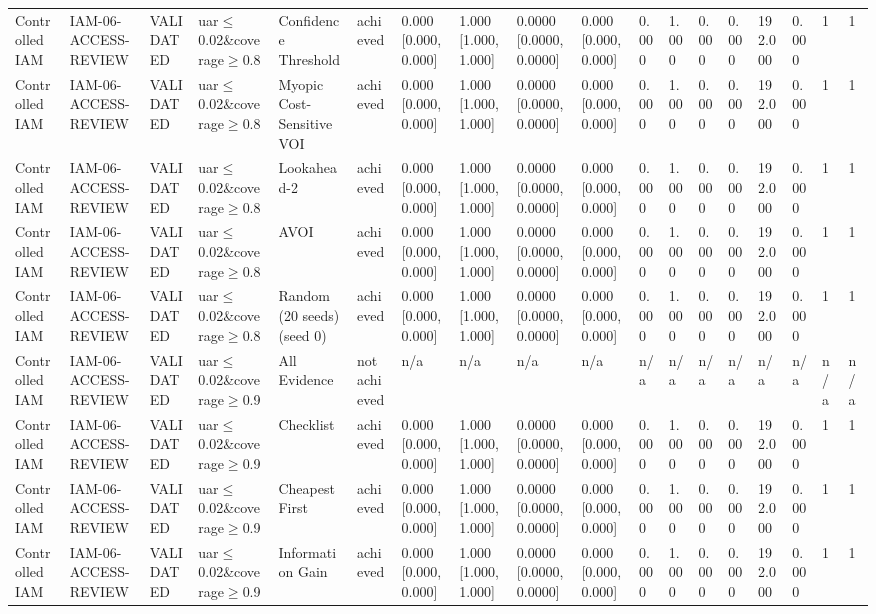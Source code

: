 \begin{table}[!ht]
{\begin{tabular}{llllllllllllllllll}
Controlled IAM & IAM-06-ACCESS-REVIEW & VALIDATED & uar$\le$0.02\&coverage$\ge$0.8 & Confidence Threshold & achieved & 0.000 [0.000, 0.000] & 1.000 [1.000, 1.000] & 0.0000 [0.0000, 0.0000] & 0.000 [0.000, 0.000] & 0.000 & 1.000 & 0.000 & 0.000 & 192.000 & 0.000 & 1 & 1 \\
Controlled IAM & IAM-06-ACCESS-REVIEW & VALIDATED & uar$\le$0.02\&coverage$\ge$0.8 & Myopic Cost-Sensitive VOI & achieved & 0.000 [0.000, 0.000] & 1.000 [1.000, 1.000] & 0.0000 [0.0000, 0.0000] & 0.000 [0.000, 0.000] & 0.000 & 1.000 & 0.000 & 0.000 & 192.000 & 0.000 & 1 & 1 \\
Controlled IAM & IAM-06-ACCESS-REVIEW & VALIDATED & uar$\le$0.02\&coverage$\ge$0.8 & Lookahead-2 & achieved & 0.000 [0.000, 0.000] & 1.000 [1.000, 1.000] & 0.0000 [0.0000, 0.0000] & 0.000 [0.000, 0.000] & 0.000 & 1.000 & 0.000 & 0.000 & 192.000 & 0.000 & 1 & 1 \\
Controlled IAM & IAM-06-ACCESS-REVIEW & VALIDATED & uar$\le$0.02\&coverage$\ge$0.8 & AVOI & achieved & 0.000 [0.000, 0.000] & 1.000 [1.000, 1.000] & 0.0000 [0.0000, 0.0000] & 0.000 [0.000, 0.000] & 0.000 & 1.000 & 0.000 & 0.000 & 192.000 & 0.000 & 1 & 1 \\
Controlled IAM & IAM-06-ACCESS-REVIEW & VALIDATED & uar$\le$0.02\&coverage$\ge$0.8 & Random (20 seeds) (seed 0) & achieved & 0.000 [0.000, 0.000] & 1.000 [1.000, 1.000] & 0.0000 [0.0000, 0.0000] & 0.000 [0.000, 0.000] & 0.000 & 1.000 & 0.000 & 0.000 & 192.000 & 0.000 & 1 & 1 \\
Controlled IAM & IAM-06-ACCESS-REVIEW & VALIDATED & uar$\le$0.02\&coverage$\ge$0.9 & All Evidence & not achieved & n/a & n/a & n/a & n/a & n/a & n/a & n/a & n/a & n/a & n/a & n/a & n/a \\
Controlled IAM & IAM-06-ACCESS-REVIEW & VALIDATED & uar$\le$0.02\&coverage$\ge$0.9 & Checklist & achieved & 0.000 [0.000, 0.000] & 1.000 [1.000, 1.000] & 0.0000 [0.0000, 0.0000] & 0.000 [0.000, 0.000] & 0.000 & 1.000 & 0.000 & 0.000 & 192.000 & 0.000 & 1 & 1 \\
Controlled IAM & IAM-06-ACCESS-REVIEW & VALIDATED & uar$\le$0.02\&coverage$\ge$0.9 & Cheapest First & achieved & 0.000 [0.000, 0.000] & 1.000 [1.000, 1.000] & 0.0000 [0.0000, 0.0000] & 0.000 [0.000, 0.000] & 0.000 & 1.000 & 0.000 & 0.000 & 192.000 & 0.000 & 1 & 1 \\
Controlled IAM & IAM-06-ACCESS-REVIEW & VALIDATED & uar$\le$0.02\&coverage$\ge$0.9 & Information Gain & achieved & 0.000 [0.000, 0.000] & 1.000 [1.000, 1.000] & 0.0000 [0.0000, 0.0000] & 0.000 [0.000, 0.000] & 0.000 & 1.000 & 0.000 & 0.000 & 192.000 & 0.000 & 1 & 1 \\

\end{tabular}}
\end{table}
